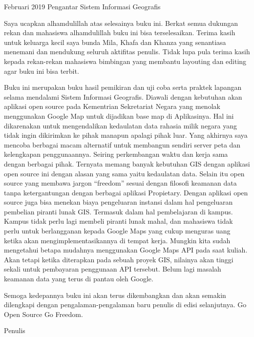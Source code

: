\documentclass{WileySix}
\begin{document}
\subtitle{Sejarah, Definisi dan Konsep Dasar}

\author{Rolly Maulana Awangga}

\halftitlepage
\titlepage



\begin{copyrightpage}{Februari 2019}
Pengantar Sistem Informasi Geografis
\end{copyrightpage}


\dedication{For my family Bunda, Khafayah dan Khanza}


\begin{preface}
	Saya ucapkan alhamdulillah atas selesainya buku ini. Berkat semua dukungan rekan dan mahasiswa alhamdulillah buku ini bisa terselesaikan. Terima kasih untuk keluarga kecil saya bunda Mila, Khafa dan Khanza yang senantiasa menemani dan mendukung seluruh aktifitas penulis. Tidak lupa pula terima kasih kepada rekan-rekan mahasiswa bimbingan yang membantu layouting dan editing agar buku ini bisa terbit.

	Buku ini merupakan buku hasil pemikiran dan uji coba serta praktek lapangan selama mendalami Sistem Informasi Geografis. Diawali dengan kebutuhan akan aplikasi open source pada Kementrian Sekretariat Negara yang menolak menggunakan Google Map untuk dijadikan base map di Aplikasinya. Hal ini dikarenakan untuk mengendalikan kedaulatan data rahasia milik negara yang tidak ingin dikirimkan ke pihak manapun apalagi pihak luar. Yang akhirnya saya mencoba berbagai macam alternatif untuk membangun sendiri server peta dan kelengkapan penggunaannya. Seiring perkembangan waktu dan kerja sama dengan berbagai pihak. Ternyata memang banyak kebutuhan GIS dengan aplikasi open source ini dengan alasan yang sama yaitu kedaulatan data. Selain itu open source yang membawa jargon “freedom” sesuai dengan filosofi keamanan data tanpa ketergantungan dengan berbagai aplikasi Propietary. Dengan aplikasi open source juga bisa menekan biaya pengeluaran instansi dalam hal pengeluaran pembelian piranti lunak GIS. Termasuk dalam hal pembelajaran di kampus. Kampus tidak perlu lagi membeli piranti lunak mahal, dan mahasiswa tidak perlu untuk berlangganan kepada Google Maps yang cukup menguras uang ketika akan mengimplementasikannya di tempat kerja. Mungkin kita sudah mengetahui betapa mudahnya menggunakan Google Maps API pada saat kuliah. Akan tetapi ketika diterapkan pada sebuah proyek GIS, nilainya akan tinggi sekali untuk pembayaran penggunaan API tersebut. Belum lagi masalah keamanan data yang terus di pantau oleh Google.

	Semoga kedepannya buku ini akan terus dikembangkan dan akan semakin dilengkapi dengan pengalaman-pengalaman baru penulis di edisi selanjutnya. Go Open Source Go Freedom.

Penulis	
\end{preface}
\end{document}
